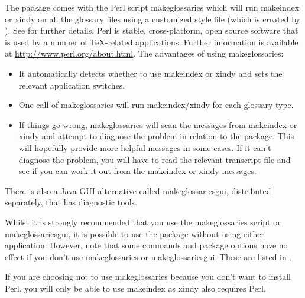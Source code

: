 \documentclass[report]{nlctdoc}
\begin{document}
The  package comes with the Perl script
\gls{makeglossaries} which will run \gls{makeindex} or \gls{xindy}
on all the glossary files using a customized style file (which is
created by ). See
 for further
details. Perl is stable, cross-platform, open source software that
is used by a number of \TeX-related applications. Further
information is available at \url{http://www.perl.org/about.html}.
The advantages of using \gls*{makeglossaries}:
\begin{itemize}
\item It automatically detects whether to use \gls*{makeindex} or
\gls*{xindy} and sets the relevant application switches.

\item One call of \gls*{makeglossaries} will run 
\gls*{makeindex}/\gls*{xindy} for each glossary type.

\item If things go wrong, \gls{makeglossaries} will scan the
messages from \gls{makeindex} or \gls{xindy} and attempt to diagnose
the problem in relation to the  package. This
will hopefully provide more helpful messages in some cases. If it
can't diagnose the problem, you will have to read the relevant transcript
file and see if you can work it out from the \gls*{makeindex} or
\gls*{xindy} messages.

\end{itemize}

There is also a Java GUI alternative called \gls{makeglossariesgui},
distributed separately, that has diagnostic tools.

Whilst it is strongly recommended that you use the
\gls{makeglossaries} script or \gls{makeglossariesgui}, it is
possible to use the  package without using either
application. However, note that some commands and package options
have no effect if you don't use \gls*{makeglossaries} or
\gls*{makeglossariesgui}. These are listed in
.

\begin{important}
If you are choosing not to use \gls*{makeglossaries} because you
don't want to install Perl, you will only be able to use
\gls*{makeindex} as \gls*{xindy} also requires Perl.
\end{important}
\end{document}
